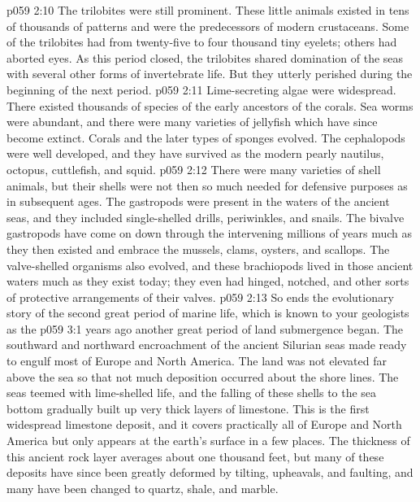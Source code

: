 \vs p059 2:10 The trilobites were still prominent. These little animals existed in tens of thousands of patterns and were the predecessors of modern crustaceans. Some of the trilobites had from twenty\hyp{}five to four thousand tiny eyelets; others had aborted eyes. As this period closed, the trilobites shared domination of the seas with several other forms of invertebrate life. But they utterly perished during the beginning of the next period.
\vs p059 2:11 Lime\hyp{}secreting algae were widespread. There existed thousands of species of the early ancestors of the corals. Sea worms were abundant, and there were many varieties of jellyfish which have since become extinct. Corals and the later types of sponges evolved. The cephalopods were well developed, and they have survived as the modern pearly nautilus, octopus, cuttlefish, and squid.
\vs p059 2:12 There were many varieties of shell animals, but their shells were not then so much needed for defensive purposes as in subsequent ages. The gastropods were present in the waters of the ancient seas, and they included single\hyp{}shelled drills, periwinkles, and snails. The bivalve gastropods have come on down through the intervening millions of years much as they then existed and embrace the mussels, clams, oysters, and scallops. The valve\hyp{}shelled organisms also evolved, and these brachiopods lived in those ancient waters much as they exist today; they even had hinged, notched, and other sorts of protective arrangements of their valves.
\pc \vs p059 2:13 So ends the evolutionary story of the second great period of marine life, which is known to your geologists as the 
\vs p059 3:1  years ago another great period of land submergence began. The southward and northward encroachment of the ancient Silurian seas made ready to engulf most of Europe and North America. The land was not elevated far above the sea so that not much deposition occurred about the shore lines. The seas teemed with lime\hyp{}shelled life, and the falling of these shells to the sea bottom gradually built up very thick layers of limestone. This is the first widespread limestone deposit, and it covers practically all of Europe and North America but only appears at the earth’s surface in a few places. The thickness of this ancient rock layer averages about one thousand feet, but many of these deposits have since been greatly deformed by tilting, upheavals, and faulting, and many have been changed to quartz, shale, and marble.
